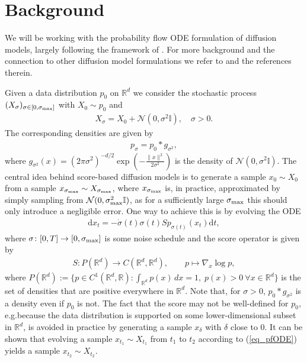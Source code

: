 \documentclass{article}
\newcommand{\R}{\mathbb{R}}
\theoremstyle{plain}
\theoremstyle{definition}
\theoremstyle{remark}
\newcommand{\cN}{\mathcal{N}}
\renewcommand{\d}{\mathrm{d}}
\newcommand{\grad}[1]{\nabla_{\! #1}}
\begin{document}

\section{Background}\label{sec:background}
We will be working with the probability flow ODE formulation of diffusion models, largely following the framework of \cite{edm}. For more background and the connection to other diffusion model formulations we refer to \cite{edm} and the references therein. 

Given a data distribution $p_0$ on $\R^d$ we consider the stochastic process $(X_\sigma)_{\sigma\in[0,\sigma_{\rm max}]}$ with $X_0\sim p_0$ and
\begin{align*}
    X_\sigma = X_0 + \cN(0,\sigma^2\mathbb{I}),\quad \sigma>0.
\end{align*}
The corresponding densities are given by
\begin{align}\label{eq:psigma}
    p_\sigma = p_0 * g_{\sigma^2},
\end{align}
where $g_{\sigma^2}(x)=(2\pi \sigma^2)^{-d/2}\exp(-\frac{\|x\|^2}{2\sigma^2})$ is the density of $\cN(0,\sigma^2\mathbb{I})$. The central  idea behind score-based diffusion models is to generate a sample $x_0\sim X_0$ from a sample $x_{\sigma_{\rm max}} \sim X_{\sigma_{\rm max}}$, where $x_{\sigma_{\rm max}}$ is, in practice, approximated by simply sampling from $\cN(0,\sigma_{\rm max}^2\mathbb{I})$, as for a sufficiently large $\sigma_{\rm max}$ this should only introduce a negligible error. One way to achieve this is by evolving the ODE
\begin{align}\label{eq_pfODE}
    \d x_t = -\dot{\sigma}(t)\sigma(t) Sp_{\sigma(t)}(x_t)\d t,
\end{align}
where $\sigma\colon[0,T]\to[0,\sigma_{\rm max}]$ is some noise schedule and the score operator is given by
\begin{align*}
    S\colon P(\R^d)\to C(\R^d,\R^d),\qquad 
    p \mapsto \grad{x}\log p ,
\end{align*}
where $P(\R^d):=\{p\in C^1(\R^d,\R)\colon \int_{\R^d} p(x)\,dx=1,\; p(x)>0 \ \forall x\in\R^d\}$ is the set of densities that are positive everywhere in $\R^d$. 
Note that, for $\sigma>0$, $p_0 * g_{\sigma^2}$ is a density even if $p_0$ is not. The fact that the score may not be well-defined for $p_0$, e.g.\@ because the data distribution is supported on some lower-dimensional subset in $\R^d$, is avoided in practice by generating a sample $x_\delta$ with $\delta$ close to $0$.
It can be shown \citep{song2021,edm} that evolving a sample $x_{t_1}\sim X_{t_1}$ from $t_1$ to $t_2$ according to (\ref{eq_pfODE}) yields a sample $x_{t_2}\sim X_{t_2}$.
\end{document}
